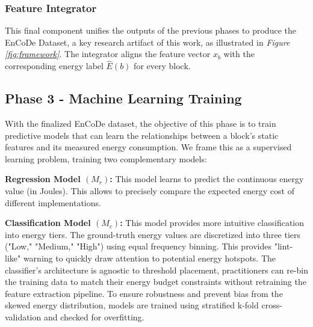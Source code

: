 

\subsubsection{Feature Integrator}

\noindent
This final component unifies the outputs of the previous phases to produce the EnCoDe Dataset, a key research artifact of this work, as illustrated in \textit{Figure \ref{fig:framework}}. The integrator aligns the feature vector \(x_b\) with the corresponding energy label \(\hat{E}(b)\) for every block.




\subsection{Phase 3 - Machine Learning Training}

\noindent
With the finalized EnCoDe dataset, the objective of this phase is to train predictive models that can learn the relationships between a block's static features and its measured energy consumption. We frame this as a supervised learning problem, training two complementary models:
  
\noindent
\textbf{Regression Model \((M_r)\):} This model learns to predict the continuous energy value (in Joules). This allows to precisely compare the expected energy cost of different implementations.

\noindent
\textbf{Classification Model \((M_c)\):} This model provides more intuitive classification into energy tiers. The ground-truth energy values are discretized into three tiers ("Low," "Medium," "High") using equal frequency binning. This provides "lint-like" warning to quickly draw attention to potential energy hotspots. 
The classifier's architecture is agnostic to threshold placement,
practitioners can re-bin the training data to match their energy budget
constraints without retraining the feature extraction pipeline.
\noindent
 To ensure robustness and prevent bias from the skewed energy distribution, models are trained using stratified k-fold cross-validation and checked for overfitting.

